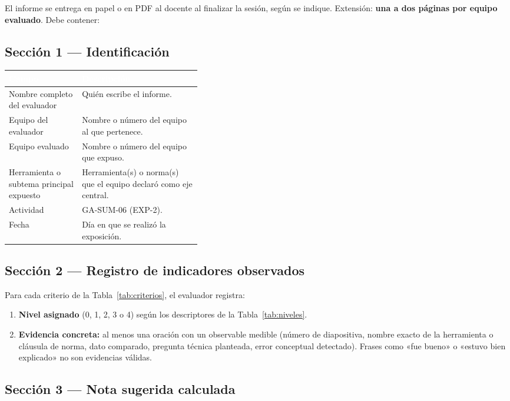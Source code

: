 \documentclass[11pt]{article}
\newcommand{\bhdr}[1]{\cellcolor{midblue}\textcolor{white}{\textbf{#1}}}
\begin{document}
El informe se entrega en papel o en PDF al docente al finalizar la sesión, según se indique. Extensión: \textbf{una a dos páginas por equipo evaluado}. Debe contener:

\subsection{\textcolor{midblue}{Sección 1 --- Identificación}}

\noindent\begin{tabularx}{\linewidth}{|L{0.38\linewidth}|Y|}
	\hline
	\bhdr{Campo} & \bhdr{Descripción}\\
	\hline
	Nombre completo del evaluador & Quién escribe el informe.\\
	\hline
	 Equipo del evaluador & Nombre o número del equipo al que pertenece.\\
	\hline
	Equipo evaluado & Nombre o número del equipo que expuso.\\
	\hline
	 Herramienta o subtema principal expuesto & Herramienta(s) o norma(s) que el equipo declaró como eje central.\\
	\hline
	Actividad & GA-SUM-06 (EXP-2).\\
	\hline
	 Fecha & Día en que se realizó la exposición.\\
	\hline
\end{tabularx}

\subsection{\textcolor{midblue}{Sección 2 --- Registro de indicadores observados}}

Para cada criterio de la Tabla~\ref{tab:criterios}, el evaluador registra:
\begin{enumerate}[leftmargin=18pt,itemsep=3pt]
	\item \textbf{Nivel asignado} (0, 1, 2, 3 o 4) según los descriptores de la Tabla~\ref{tab:niveles}.
	\item \textbf{Evidencia concreta:} al menos una oración con un observable medible (número de diapositiva, nombre exacto de la herramienta o cláusula de norma, dato comparado, pregunta técnica planteada, error conceptual detectado). Frases como «fue bueno» o «estuvo bien explicado» no son evidencias válidas.
\end{enumerate}

\subsection{\textcolor{midblue}{Sección 3 --- Nota sugerida calculada}}
\end{document}

